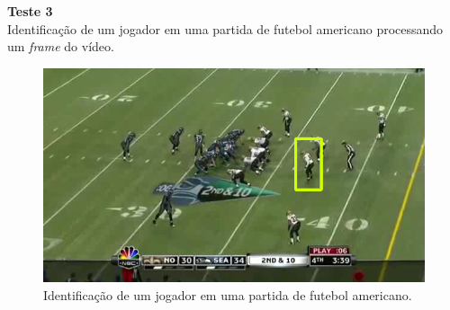\textbf{Teste 3}\\
Identificação de um jogador em uma partida de futebol americano processando um \textit{frame} do vídeo.

\begin{figure}
    \centering
    \caption{Identificação de um jogador em uma partida de futebol americano.}
    \includegraphics[scale=0.4]{05-SLIDES_DESENVOLVIMENTO/Etapa_de_Testes/imagens_testes/identificacao_jogador_em_campo_2.png}
\end{figure}